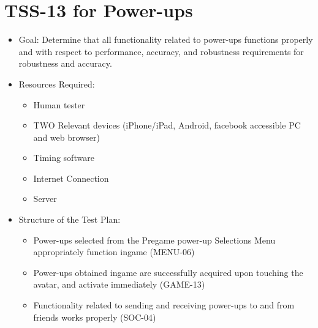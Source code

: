 \section{TSS-13 for Power-ups}
\begin{itemize}
\item Goal: Determine that all functionality related to power-ups functions properly and with respect to performance, accuracy, and robustness requirements for robustness and accuracy.

\item Resources Required:
\begin{itemize}
\item Human tester
\item TWO Relevant devices (iPhone/iPad, Android, facebook accessible PC and web browser)
\item Timing software
\item Internet Connection 
\item Server
\end{itemize}

\item Structure of the Test Plan: 
\begin{itemize}
\item Power-ups selected from the Pregame power-up Selections Menu appropriately function ingame (MENU-06)
\item Power-ups obtained ingame are successfully acquired upon touching the avatar, and activate immediately (GAME-13)
\item Functionality related to sending and receiving power-ups to and from friends works properly (SOC-04)

\end{itemize}
\end{itemize}

